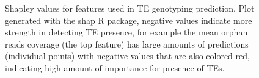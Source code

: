 \begin{figure}
    \centering
    \caption[Shapley values for features used in TE genotyping prediction.]{Shapley values for features used in TE genotyping prediction. Plot generated with the shap R package, negative values indicate more strength in detecting TE presence, for example the mean orphan reads coverage (the top feature) has large amounts of predictions (individual points) with negative values that are also colored red, indicating high amount of importance for presence of TEs. }
    \label{fig:teshapley}
\end{figure}